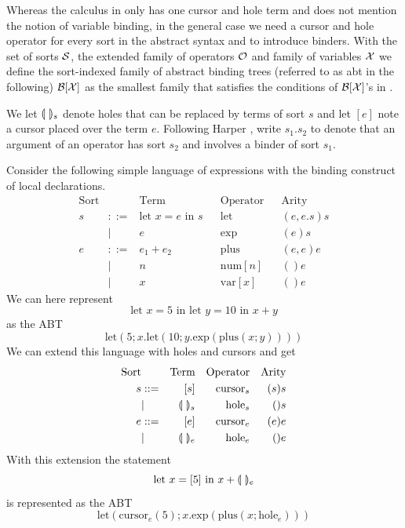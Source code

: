 \documentclass[sigplan,review]{acmart}
\newcommand{\abt}{\textsf{abt}\xspace}
\begin{document}
Whereas the calculus in \cite{type_safe_structure_editor} only has one
cursor and hole term and does not mention the notion of variable
binding, in the general case we need a cursor and hole operator for
every sort in the abstract syntax and to introduce binders.  With the
set of sorts $\mathcal{S}$, the extended family of operators $\mathcal{O}$ and
family of variables $\mathcal{X}$ we define the sort-indexed family of
abstract binding trees (referred to as \abt in the following) $\mathcal{B}[\mathcal{X} ]$
as the smallest family that satisfies the conditions of $\mathcal{B}[\mathcal{X} ]$'s in
\cite{harper_foundations}.

We let $\llparenthesis \ \rrparenthesis_s$ denote holes that can be replaced by terms of sort
$s$ and let $[e]$ note a cursor placed over the term $e$. Following
Harper \cite{harper_foundations}, write $s_1.s_2$ to denote that an
argument of an operator has sort $s_2$ and involves a binder of sort
$s_1$.

\begin{example}\label{ex:abstract_syntax}
Consider the following simple language of expressions with the binding
construct of local declarations.
\begin{align*}
  \text{Sort} && \text{Term} && \text{Operator} && \text{Arity} \\
        s & ::= & \text{let $x = e$ in $s$} && \text{let} && (e, e.s)s \\
        & | & e && \text{exp} && (e)s \\
  e & ::= & e_1 + e_2 && \text{plus} && (e,e)e \\
        & | & n && \text{num}[n] &&  ()e \\
        & | & x && \text{var}[x] && ()e
\end{align*}
 We can here represent
    \begin{equation*}
        \text{let $x=5$ in let $y=10$ in $x+y$}
    \end{equation*}
    as the ABT
    \begin{equation*}
        \text{let}(5;x.\text{let}(10;y.\text{exp}(\text{plus}(x;y))))
    \end{equation*} 
%
    We can extend this language with holes and cursors and get
\begin{align*}
        \text{Sort} && \text{Term} && \text{Operator} && \text{Arity} \\
        s & ::= & [s] && \text{cursor}_s && (s)s \\
        & | & \llparenthesis \ \rrparenthesis_s && \text{hole}_s && ()s \\
        e & ::= & [e] && \text{cursor}_e && (e)e \\
        & | & \llparenthesis \ \rrparenthesis_e && \text{hole}_e && ()e
 \end{align*}
%
    With this extension the statement
    \begin{equation*}
        \text{let $x=[5]$ in $x+\llparenthesis \ \rrparenthesis_e$}
    \end{equation*}
    is represented as the ABT
    \begin{equation*}
        \text{let}(\text{cursor}_e(5); x.\text{exp}(\text{plus}(x;\text{hole}_e)))    
    \end{equation*}
\end{example}
\end{document}
